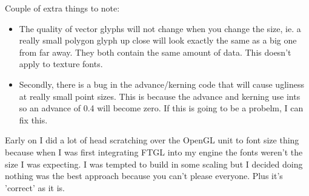 Couple of extra things to note:

\begin{itemize}
\item The quality of vector glyphs will not change when you change the size, ie. a really small polygon glyph up close will look exactly the same as a big one from far away. They both contain the same amount of data. This doesn't apply to texture fonts.\end{itemize}


\begin{itemize}
\item Secondly, there is a bug in the advance/kerning code that will cause ugliness at really small point sizes. This is because the advance and kerning use ints so an advance of 0.4 will become zero. If this is going to be a probelm, I can fix this.\end{itemize}


Early on I did a lot of head scratching over the OpenGL unit to font size thing because when I was first integrating FTGL into my engine the fonts weren't the size I was expecting. I was tempted to build in some scaling but I decided doing nothing was the best approach because you can't please everyone. Plus it's 'correct' as it is. 